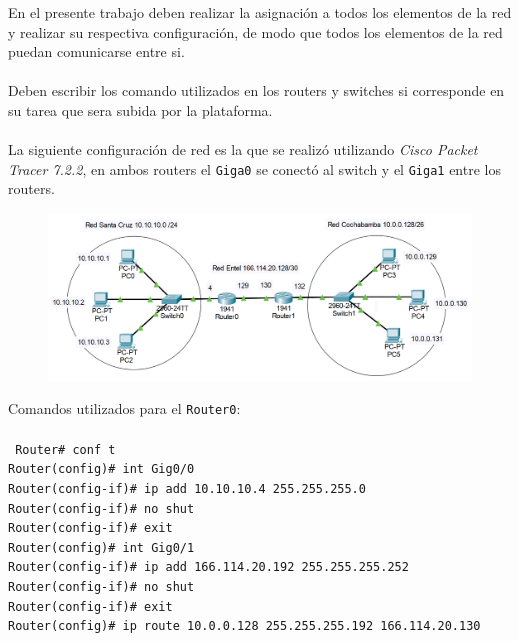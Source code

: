 \item {\color{red} En el presente trabajo deben realizar la asignación a todos los elementos de la red y realizar su respectiva configuración, de modo que todos los elementos de la red puedan comunicarse entre si. 
\\{ }\\
Deben escribir los comando utilizados en los routers y switches si corresponde en su tarea que sera subida por la plataforma.}\\{ }\\
\noindent
La siguiente configuración de red es la que se realizó utilizando \textit{Cisco Packet Tracer 7.2.2}, en ambos routers el \texttt{Giga0} se conectó al switch y el \texttt{Giga1} entre los routers.

\begin{figure}[ht!]
\centering
\includegraphics[scale=0.75]{Imagenes/net.png}
\end{figure}
Comandos utilizados para el \texttt{Router0}: \\{ }\\
\texttt{
\noindent
Router\# conf t \\
Router(config)\# int Gig0/0 \\
Router(config-if)\# ip add 10.10.10.4 255.255.255.0 \\
Router(config-if)\# no shut \\
Router(config-if)\# exit \\
Router(config)\# int Gig0/1 \\
Router(config-if)\# ip add 166.114.20.192 255.255.255.252 \\
Router(config-if)\# no shut \\
Router(config-if)\# exit \\
Router(config)\# ip route 10.0.0.128 255.255.255.192 166.114.20.130
}

